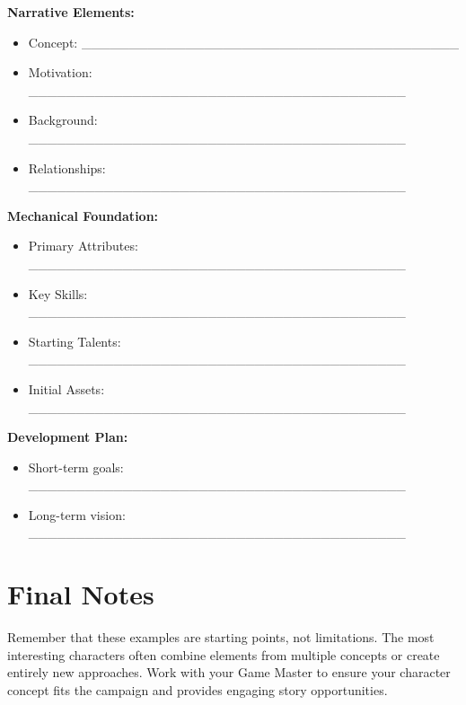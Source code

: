 \documentclass[11pt,twoside,openany]{book}
\begin{document}
\begin{tcolorbox}[colback=gray!5!white, colframe=gray!75!black, title=Character Concept Worksheet, fonttitle=\bfseries,breakable]
\textbf{Narrative Elements:}
\begin{itemize}
\item Concept: \_\_\_\_\_\_\_\_\_\_\_\_\_\_\_\_\_\_\_\_\_\_\_\_\_\_\_\_\_\_\_\_\_\_\_\_\_\_\_\_
\item Motivation: \_\_\_\_\_\_\_\_\_\_\_\_\_\_\_\_\_\_\_\_\_\_\_\_\_\_\_\_\_\_\_\_\_\_\_\_\_\_\_\_
\item Background: \_\_\_\_\_\_\_\_\_\_\_\_\_\_\_\_\_\_\_\_\_\_\_\_\_\_\_\_\_\_\_\_\_\_\_\_\_\_\_\_
\item Relationships: \_\_\_\_\_\_\_\_\_\_\_\_\_\_\_\_\_\_\_\_\_\_\_\_\_\_\_\_\_\_\_\_\_\_\_\_\_\_\_\_
\end{itemize}

\textbf{Mechanical Foundation:}
\begin{itemize}
\item Primary Attributes: \_\_\_\_\_\_\_\_\_\_\_\_\_\_\_\_\_\_\_\_\_\_\_\_\_\_\_\_\_\_\_\_\_\_\_\_\_\_\_\_
\item Key Skills: \_\_\_\_\_\_\_\_\_\_\_\_\_\_\_\_\_\_\_\_\_\_\_\_\_\_\_\_\_\_\_\_\_\_\_\_\_\_\_\_
\item Starting Talents: \_\_\_\_\_\_\_\_\_\_\_\_\_\_\_\_\_\_\_\_\_\_\_\_\_\_\_\_\_\_\_\_\_\_\_\_\_\_\_\_
\item Initial Assets: \_\_\_\_\_\_\_\_\_\_\_\_\_\_\_\_\_\_\_\_\_\_\_\_\_\_\_\_\_\_\_\_\_\_\_\_\_\_\_\_
\end{itemize}

\textbf{Development Plan:}
\begin{itemize}
\item Short-term goals: \_\_\_\_\_\_\_\_\_\_\_\_\_\_\_\_\_\_\_\_\_\_\_\_\_\_\_\_\_\_\_\_\_\_\_\_\_\_\_\_
\item Long-term vision: \_\_\_\_\_\_\_\_\_\_\_\_\_\_\_\_\_\_\_\_\_\_\_\_\_\_\_\_\_\_\_\_\_\_\_\_\_\_\_\_
\end{itemize}
\end{tcolorbox}

\section*{Final Notes} 

Remember that these examples are starting points, not limitations. The most interesting characters often combine elements from multiple concepts or create entirely new approaches. Work with your Game Master to ensure your character concept fits the campaign and provides engaging story opportunities.
\end{document}
